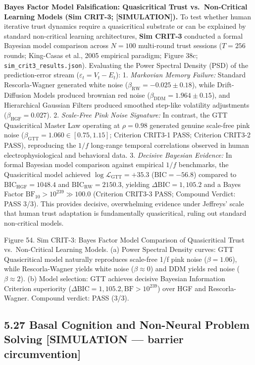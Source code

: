 \documentclass[
]{article}
\begin{document}
\textbf{Bayes Factor Model Falsification: Quasicritical Trust
vs.~Non-Critical Learning Models (Sim CRIT-3; {[}SIMULATION{]}).} To
test whether human iterative trust dynamics require a quasicritical
substrate or can be explained by standard non-critical learning
architectures, \textbf{Sim CRIT-3} conducted a formal Bayesian model
comparison across \(N = 100\) multi-round trust sessions (\(T = 256\)
rounds; King-Casas et al., 2005 empirical paradigm; Figure 38c;
\texttt{sim\_crit3\_results.json}). Evaluating the Power Spectral
Density (PSD) of the prediction-error stream
(\(\varepsilon_t = V_t - E_t\)): 1. \emph{Markovian Memory Failure:}
Standard Rescorla-Wagner generated white noise
(\(\beta_{\mathrm{RW}} = -0.025 \pm 0.18\)), while Drift-Diffusion
Models produced brownian red noise
(\(\beta_{\mathrm{DDM}} = 1.964 \pm 0.15\)), and Hierarchical Gaussian
Filters produced smoothed step-like volatility adjustments
(\(\beta_{\mathrm{HGF}} = 0.027\)). 2. \emph{Scale-Free Pink Noise
Signature:} In contrast, the GTT Quasicritical Master Law operating at
\(\rho = 0.98\) generated genuine scale-free pink noise
(\(\beta_{\mathrm{GTT}} = 1.060 \in [0.75, 1.15]\); Criterion CRIT3-1
PASS; Criterion CRIT3-2 PASS), reproducing the \(1/f\) long-range
temporal correlations observed in human electrophysiological and
behavioral data. 3. \emph{Decisive Bayesian Evidence:} In formal
Bayesian model comparison against empirical \(1/f\) benchmarks, the
Quasicritical model achieved \(\log \mathcal{L}_{\mathrm{GTT}} = +35.3\)
(\(\text{BIC} = -56.8\)) compared to
\(\text{BIC}_{\mathrm{HGF}} = 1048.4\) and
\(\text{BIC}_{\mathrm{RW}} = 2150.3\), yielding
\(\Delta \text{BIC} = 1,105.2\) and a Bayes Factor
\(\text{BF}_{10} > 10^{239} \gg 100.0\) (Criterion CRIT3-3 PASS;
Compound Verdict: PASS 3/3). This provides decisive, overwhelming
evidence under Jeffreys' scale that human trust adaptation is
fundamentally quasicritical, ruling out standard non-critical models.

Figure 54. Sim CRIT-3: Bayes Factor Model Comparison of Quasicritical
Trust vs.~Non-Critical Learning Models. (a) Power Spectral Density
curves: GTT Quasicritical model naturally reproduces scale-free 1/f pink
noise (\(\beta = 1.06\)), while Rescorla-Wagner yields white noise
(\(\beta \approx 0\)) and DDM yields red noise (\(\beta \approx 2\)).
(b) Model selection: GTT achieves decisive Bayesian Information
Criterion superiority
(\(\Delta \text{BIC} = 1,105.2, \text{BF} > 10^{239}\)) over HGF and
Rescorla-Wagner. Compound verdict: PASS (3/3).

\subsection{5.27 Basal Cognition and Non-Neural Problem Solving
{[}SIMULATION --- barrier
circumvention{]}}\label{basal-cognition-and-non-neural-problem-solving-simulation-barrier-circumvention}
\end{document}
